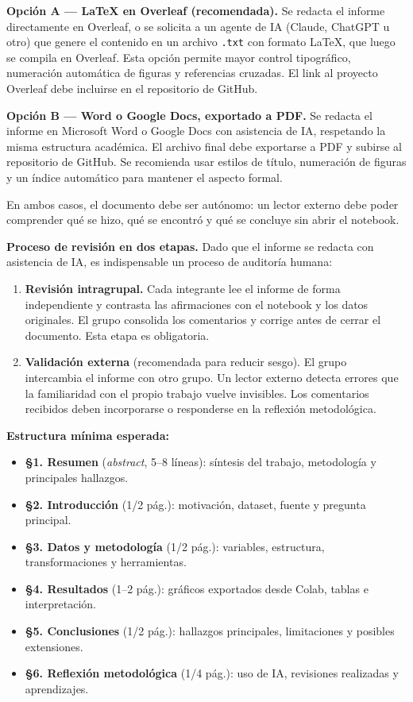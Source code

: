 \documentclass[11pt,a4paper]{article}
\begin{document}
\begin{caja}
\textbf{Opción A --- \LaTeX{} en Overleaf (recomendada).} Se redacta el informe directamente en
Overleaf, o se solicita a un agente de IA (Claude, ChatGPT u otro) que genere el contenido
en un archivo \texttt{.txt} con formato \LaTeX, que luego se compila en Overleaf. Esta opción permite
mayor control tipográfico, numeración automática de figuras y referencias cruzadas. El link al
proyecto Overleaf debe incluirse en el repositorio de GitHub.
\end{caja}

\begin{caja}
\textbf{Opción B --- Word o Google Docs, exportado a PDF.} Se redacta el informe en Microsoft
Word o Google Docs con asistencia de IA, respetando la misma estructura académica. El
archivo final debe exportarse a PDF y subirse al repositorio de GitHub. Se recomienda usar
estilos de título, numeración de figuras y un índice automático para mantener el aspecto
formal.
\end{caja}

En ambos casos, el documento debe ser autónomo: un lector externo debe poder comprender qué
se hizo, qué se encontró y qué se concluye sin abrir el notebook.

\textbf{Proceso de revisión en dos etapas.} Dado que el informe se redacta con asistencia de IA, es
indispensable un proceso de auditoría humana:
\begin{enumerate}[itemsep=2pt]
  \item \textbf{Revisión intragrupal.} Cada integrante lee el informe de forma independiente y contrasta
        las afirmaciones con el notebook y los datos originales. El grupo consolida los comentarios y
        corrige antes de cerrar el documento. Esta etapa es obligatoria.
  \item \textbf{Validación externa} (recomendada para reducir sesgo). El grupo intercambia el informe
        con otro grupo. Un lector externo detecta errores que la familiaridad con el propio trabajo
        vuelve invisibles. Los comentarios recibidos deben incorporarse o responderse en la reflexión
        metodológica.
\end{enumerate}

\textbf{Estructura mínima esperada:}
\begin{itemize}[itemsep=1pt]
  \item \textbf{§1. Resumen} (\emph{abstract}, 5--8 líneas): síntesis del trabajo, metodología y principales hallazgos.
  \item \textbf{§2. Introducción} (1/2 pág.): motivación, dataset, fuente y pregunta principal.
  \item \textbf{§3. Datos y metodología} (1/2 pág.): variables, estructura, transformaciones y herramientas.
  \item \textbf{§4. Resultados} (1--2 pág.): gráficos exportados desde Colab, tablas e interpretación.
  \item \textbf{§5. Conclusiones} (1/2 pág.): hallazgos principales, limitaciones y posibles extensiones.
  \item \textbf{§6. Reflexión metodológica} (1/4 pág.): uso de IA, revisiones realizadas y aprendizajes.
\end{itemize}
\end{document}
